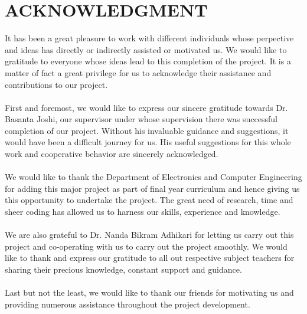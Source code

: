 \newpage
\section*{ACKNOWLEDGMENT}

It has been a great pleasure to work with different individuals whose perpective and ideas has directly or indirectly assisted or motivated us. 
We would like to gratitude to everyone whose ideas lead to this completion of the project. It is a matter of fact a great privilege for us to 
acknowledge their assistance and contributions to our project.\\
\\
First and foremost, we would like to express our sincere gratitude towards Dr. Basanta Joshi, our supervisor under whose supervision there was successful completion of our project. Without his
invaluable guidance and suggestions, it would have been a difficult journey for us. His useful suggestions for this whole work and cooperative
behavior are sincerely acknowledged.\\
\\
We would like to thank the Department of Electronics and Computer Engineering for adding this major project as part of final year curriculum
and hence giving us this opportunity to undertake the project. The great need of research, time and sheer coding has allowed us to harness our
skills, experience and knowledge.\\ 
\\
We are also grateful to Dr. Nanda Bikram Adhikari for letting us carry out this project and co-operating with us to carry out the project smoothly. We would like to thank and express our gratitude  to all out
respective subject teachers for sharing their precious knowledge, constant support and guidance.\\
\\
Last but not the least, we would like to thank our friends for motivating us and providing numerous assistance throughout the project development.\\


